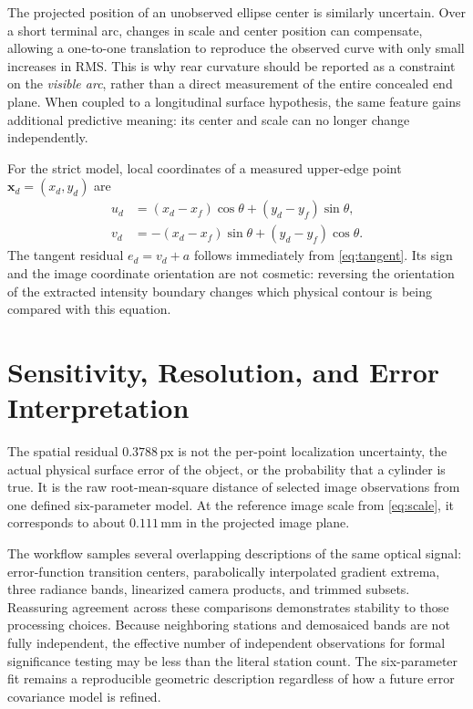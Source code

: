 \documentclass[11pt,letterpaper]{article}
\newcommand{\px}{\,\mathrm{px}}
\newcommand{\mat}[1]{\mathbf{#1}}
\begin{document}
The projected position of an unobserved ellipse center is similarly uncertain. Over a short terminal arc, changes in scale and center position can compensate, allowing a one-to-one translation to reproduce the observed curve with only small increases in RMS. This is why rear curvature should be reported as a constraint on the \emph{visible arc}, rather than a direct measurement of the entire concealed end plane. When coupled to a longitudinal surface hypothesis, the same feature gains additional predictive meaning: its center and scale can no longer change independently.

For the strict model, local coordinates of a measured upper-edge point \(\mat x_d=(x_d,y_d)\) are
\begin{align}
 u_d&=(x_d-x_f)\cos\theta+(y_d-y_f)\sin\theta,\\
 v_d&=-(x_d-x_f)\sin\theta+(y_d-y_f)\cos\theta.
\end{align}
The tangent residual \(e_d=v_d+a\) follows immediately from \cref{eq:tangent}. Its sign and the image coordinate orientation are not cosmetic: reversing the orientation of the extracted intensity boundary changes which physical contour is being compared with this equation.

\section{Sensitivity, Resolution, and Error Interpretation}
\label{app:error}

The spatial residual \(0.3788\px\) is not the per-point localization uncertainty, the actual physical surface error of the object, or the probability that a cylinder is true. It is the raw root-mean-square distance of selected image observations from one defined six-parameter model. At the reference image scale from \cref{eq:scale}, it corresponds to about \(0.111\,\mathrm{mm}\) in the projected image plane.

The workflow samples several overlapping descriptions of the same optical signal: error-function transition centers, parabolically interpolated gradient extrema, three radiance bands, linearized camera products, and trimmed subsets. Reassuring agreement across these comparisons demonstrates stability to those processing choices. Because neighboring stations and demosaiced bands are not fully independent, the effective number of independent observations for formal significance testing may be less than the literal station count. The six-parameter fit remains a reproducible geometric description regardless of how a future error covariance model is refined.
\end{document}
